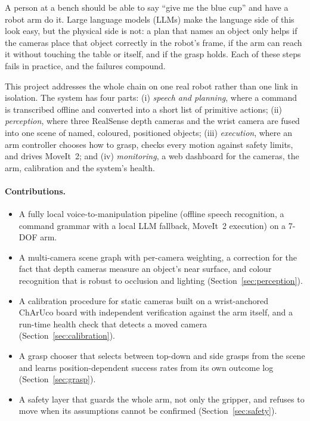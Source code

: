\documentclass[12pt]{article}
\begin{document}
A person at a bench should be able to say ``give me the blue cup'' and have a robot arm do it. Large language models (LLMs) make the language side of this look easy, but the physical side is not: a plan that names an object only helps if the cameras place that object correctly in the robot's frame, if the arm can reach it without touching the table or itself, and if the grasp holds. Each of these steps fails in practice, and the failures compound.

This project addresses the whole chain on one real robot rather than one link in isolation. The system has four parts: (i) \emph{speech and planning}, where a command is transcribed offline and converted into a short list of primitive actions; (ii) \emph{perception}, where three RealSense depth cameras and the wrist camera are fused into one scene of named, coloured, positioned objects; (iii) \emph{execution}, where an arm controller chooses how to grasp, checks every motion against safety limits, and drives MoveIt~2; and (iv) \emph{monitoring}, a web dashboard for the cameras, the arm, calibration and the system's health.

\paragraph{Contributions.}
\begin{itemize}
  \item A fully local voice-to-manipulation pipeline (offline speech recognition, a command grammar with a local LLM fallback, MoveIt~2 execution) on a 7-DOF arm.
  \item A multi-camera scene graph with per-camera weighting, a correction for the fact that depth cameras measure an object's near surface, and colour recognition that is robust to occlusion and lighting (Section~\ref{sec:perception}).
  \item A calibration procedure for static cameras built on a wrist-anchored ChArUco board with independent verification against the arm itself, and a run-time health check that detects a moved camera (Section~\ref{sec:calibration}).
  \item A grasp chooser that selects between top-down and side grasps from the scene and learns position-dependent success rates from its own outcome log (Section~\ref{sec:grasp}).
  \item A safety layer that guards the whole arm, not only the gripper, and refuses to move when its assumptions cannot be confirmed (Section~\ref{sec:safety}).
\end{itemize}
\end{document}

